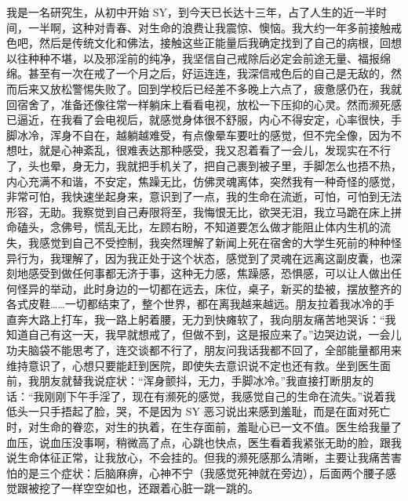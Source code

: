 \begin{case}
    我是一名研究生，从初中开始 SY，到今天已长达十三年，占了人生的近一半时间，一半啊，这种对青春、对生命的浪费让我震惊、懊恼。我大约一年多前接触戒色吧，然后是传统文化和佛法，接触这些正能量后我确定找到了自己的病根，回想以往种种不堪，以及邪淫前的纯净，我坚信自己戒除后必定会前途无量、福报绵绵。甚至有一次在戒了一个月之后，好运连连，我深信戒色后的自己是无敌的，然而后来又放松警惕失败了。回到学校后已经差不多晚上六点了，疲惫感仍在，我就回宿舍了，准备还像往常一样躺床上看看电视，放松一下压抑的心灵。然而濒死感已逼近，在我看了会电视后，就感觉身体很不舒服，内心不得安定，心率很快，手脚冰冷，浑身不自在，越躺越难受，有点像晕车要吐的感觉，但不完全像，因为不想吐，就是心神紊乱，很难表达那种感受，我又忍着看了一会儿，发现实在不行了，头也晕，身无力，我就把手机关了，把自己裹到被子里，手脚怎么也捂不热，内心充满不和谐，不安定，焦躁无比，仿佛灵魂离体，突然我有一种奇怪的感觉，非常可怕，我快速坐起身来，意识到了一点，我的生命在流逝，可怕，可怕到无法形容，无助。我察觉到自己寿限将至，我悔恨无比，欲哭无泪，我立马跪在床上拼命磕头，念佛号，慌乱无比，左顾右盼，不知道要怎么做才能阻止体内生机的流失，我感觉到自己不受控制，我突然理解了新闻上死在宿舍的大学生死前的种种怪异行为，我理解了，因为我正处于这个状态，感觉到了灵魂在远离这副皮囊，也深刻地感受到做任何事都无济于事，这种无力感，焦躁感，恐惧感，可以让人做出任何怪异的举动，此时身边的一切都在远去，床位，桌子，新买的垫被，摆放整齐的各式皮鞋……一切都结束了，整个世界，都在离我越来越远。朋友拉着我冰冷的手直奔大路上打车，我一路上躬着腰，无力到快瘫软了，我向朋友痛苦地哭诉：“我知道自己有这一天，我早就想戒了，但做不到，这是报应来了。”边哭边说，一会儿功夫脑袋不能思考了，连交谈都不行了，朋友问我话我都不回了，全部能量都用来维持意识了，心想只要能赶到医院，即使失去意识说不定也还有救。坐到医生面前，我朋友就替我说症状：“浑身颤抖，无力，手脚冰冷。”我直接打断朋友的话：“我刚刚下午手淫了，现在有濒死的感觉，我感觉自己的生命在流失。”说着我低头一只手捂起了脸，哭，不是因为 SY 恶习说出来感到羞耻，而是在面对死亡时，对生命的眷恋，对生的执着，在生存面前，羞耻心已一文不值。医生给我量了血压，说血压没事啊，稍微高了点，心跳也快点，医生看着我紧张无助的脸，跟我说生命体征正常，让我放心，不会挂的。但我的濒死感那么清晰，主要让我痛苦害怕的是三个症状：后脑麻痹，心神不宁（我感觉死神就在旁边），后面两个腰子感觉跟被挖了一样空空如也，还跟着心脏一跳一跳的。

\end{case}

